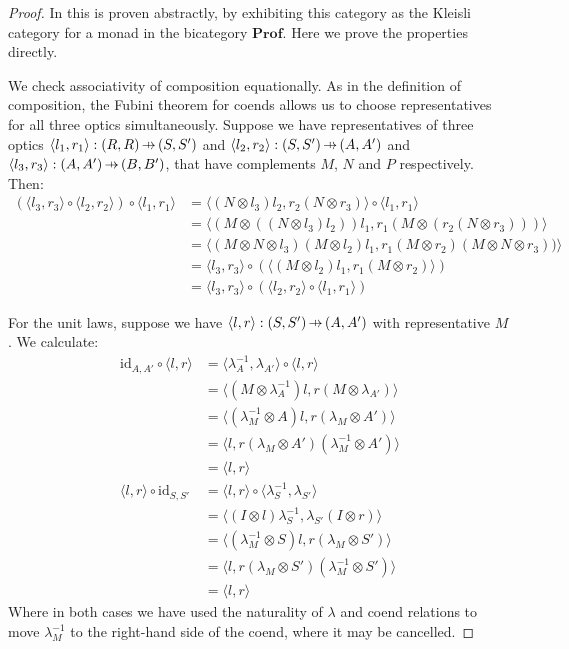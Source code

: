 \documentclass[11pt,a4paper]{article}
\theoremstyle{plain}
\theoremstyle{definition}
\newcommand{\Prof}{\mathbf{Prof}}
\newcommand{\id}{\mathrm{id}}
\newcommand{\hto}{\ensuremath{\,\mathaccent\shortmid\rightarrow\,}}
\begin{document}
\begin{proof}
In \cite[Section 6]{Doubles} this is proven abstractly, by exhibiting this category as the Kleisli category for a monad in the bicategory $\Prof$. Here we prove the properties directly.

We check associativity of composition equationally. As in the definition of composition, the Fubini theorem for coends allows us to choose representatives for all three optics simultaneously. Suppose we have representatives of three optics $\langle l_1, r_1\rangle : (R, R) \hto (S, S')$ and $\langle l_2, r_2 \rangle : (S, S') \hto (A, A')$ and $\langle l_3, r_3 \rangle : (A, A') \hto (B, B')$, that have complements $M$, $N$ and $P$ respectively. Then:
\begin{align*}
(\langle l_3, r_3 \rangle \circ \langle l_2, r_2 \rangle) \circ \langle l_1, r_1 \rangle 
&= \langle (N \otimes l_3)l_2, r_2(N \otimes r_3) \rangle \circ \langle l_1, r_1 \rangle \\
&= \langle (M \otimes ((N \otimes l_3)l_2))l_1, r_1(M \otimes (r_2(N \otimes r_3))) \rangle \\
&= \langle (M \otimes N \otimes l_3)(M \otimes l_2)l_1, r_1(M \otimes r_2)(M \otimes N \otimes r_3)) \rangle \\
&= \langle l_3, r_3 \rangle \circ (\langle (M \otimes l_2)l_1, r_1(M \otimes r_2) \rangle) \\
&= \langle l_3, r_3 \rangle \circ (\langle l_2, r_2 \rangle \circ \langle l_1, r_1 \rangle)
\end{align*}

For the unit laws, suppose we have $\langle l, r \rangle : (S, S') \hto (A, A')$ with representative $M$. We calculate:
\begin{align*}
\id_{A, A'} \circ \langle l, r\rangle 
&= \langle \lambda^{-1}_A, \lambda_{A'} \rangle \circ \langle l, r\rangle \\
&= \langle (M \otimes \lambda^{-1}_A) l, r (M\otimes  \lambda_{A'})\rangle \\
&= \langle (\lambda^{-1}_M \otimes  A) l, r (\lambda_M \otimes A')\rangle \\
&= \langle l, r (\lambda_M \otimes A') (\lambda^{-1}_M \otimes A')\rangle \\
&= \langle l, r \rangle  \\
\langle l, r \rangle \circ \id_{S, S'} 
&= \langle l, r \rangle \circ \langle \lambda^{-1}_S, \lambda_{S'}\rangle  \\
&= \langle (I \otimes l)\lambda^{-1}_S, \lambda_{S'} (I \otimes r) \rangle \\
&= \langle (\lambda^{-1}_M \otimes S)l, r (\lambda_{M} \otimes S') \rangle \\
&= \langle l, r (\lambda_{M} \otimes S')(\lambda^{-1}_M \otimes S') \rangle \\
&= \langle l, r \rangle
\end{align*}
Where in both cases we have used the naturality of $\lambda$ and coend relations to move $\lambda^{-1}_M$ to the right-hand side of the coend, where it may be cancelled.
\end{proof}
\end{document}
